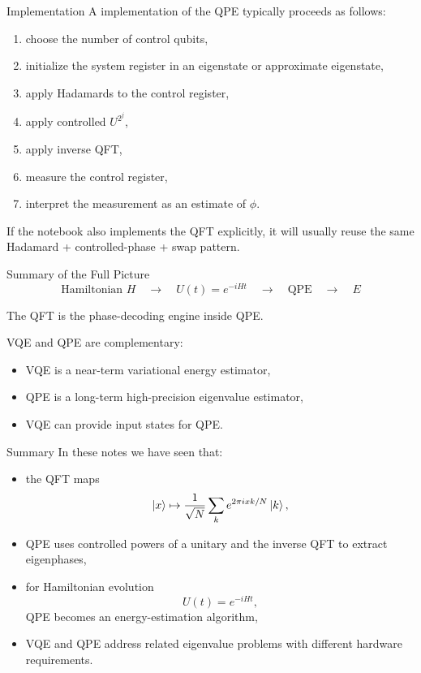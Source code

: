 \documentclass{beamer}
\begin{document}
\begin{frame}{Implementation}
A implementation of the QPE typically proceeds as follows:
\begin{enumerate}
\item choose the number of control qubits,
\item initialize the system register in an eigenstate or approximate eigenstate,
\item apply Hadamards to the control register,
\item apply controlled \(U^{2^j}\),
\item apply inverse QFT,
\item measure the control register,
\item interpret the measurement as an estimate of \(\phi\).
\end{enumerate}

If the notebook also implements the QFT explicitly, it will usually reuse the same Hadamard + controlled-phase + swap pattern.
\end{frame}

\begin{frame}{Summary of the Full Picture}
\[
\text{Hamiltonian } H
\quad \longrightarrow \quad
U(t)=e^{-iHt}
\quad \longrightarrow \quad
\text{QPE}
\quad \longrightarrow \quad
E
\]

The QFT is the phase-decoding engine inside QPE.

VQE and QPE are complementary:
\begin{itemize}
\item VQE is a near-term variational energy estimator,
\item QPE is a long-term high-precision eigenvalue estimator,
\item VQE can provide input states for QPE.
\end{itemize}
\end{frame}

\begin{frame}{Summary}
In these notes we have seen that:
\begin{itemize}
\item the QFT maps
\[
\ket{x}\mapsto \frac{1}{\sqrt N}\sum_k e^{2\pi i xk/N}\ket{k},
\]
\item QPE uses controlled powers of a unitary and the inverse QFT to extract eigenphases,
\item for Hamiltonian evolution
\[
U(t)=e^{-iHt},
\]
QPE becomes an energy-estimation algorithm,
\item VQE and QPE address related eigenvalue problems with different hardware requirements.
\end{itemize}
\end{frame}
\end{document}
